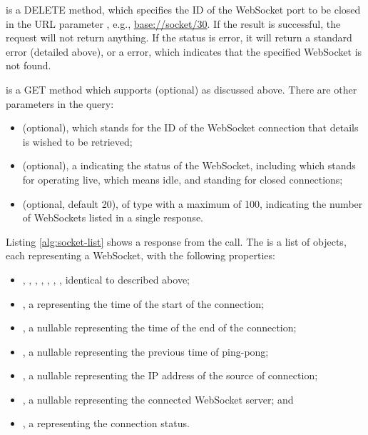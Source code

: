  is a DELETE method, which specifies the ID of the WebSocket port to be closed in the URL parameter , e.g., \url{base://socket/30}. If the result is successful, the request will not return anything. If the status is error, it will return a standard error (detailed above), or a  error, which indicates that the specified WebSocket  is not found.

 is a GET method which supports  (optional) as discussed above. There are other parameters in the query:
\begin{itemize}
    \item {} (optional), which stands for the ID of the WebSocket connection that details is wished to be retrieved;
    \item {} (optional), a  indicating the status of the WebSocket, including  which stands for operating live,  which means idle, and  standing for closed connections;
    \item {} (optional, default 20), of type  with a maximum of 100, indicating the number of WebSockets listed in a single response.
\end{itemize}

Listing \ref{alg:socket-list} shows a response from the call. The  is a list of objects, each representing a WebSocket, with the following properties:
\begin{itemize}
    \item {}, , , , , , , identical to described above;
    \item {}, a  representing the time of the start of the connection;
    \item {}, a nullable  representing the time of the end of the connection;
    \item {}, a nullable  representing the previous time of ping-pong;
    \item {}, a nullable  representing the IP address of the source of connection;
    \item {}, a nullable  representing the connected WebSocket server; and
    \item {}, a  representing the connection status.
\end{itemize}

